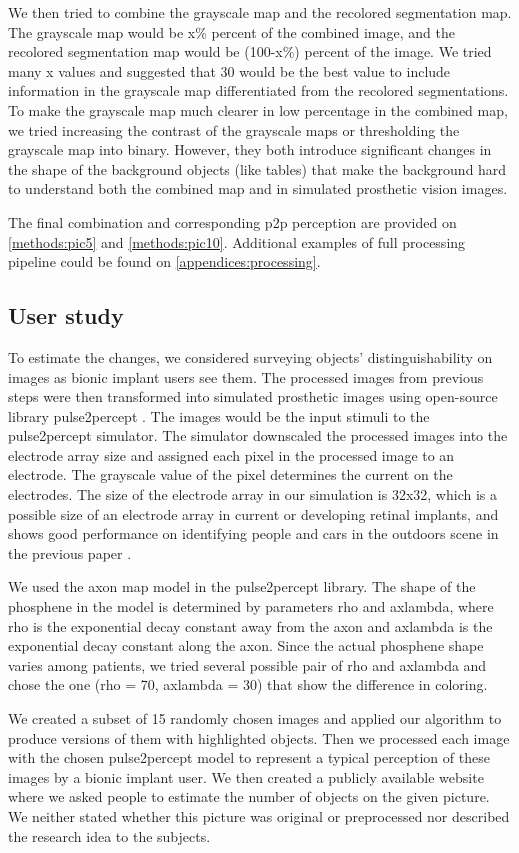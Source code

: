 We then tried to combine the grayscale map and the recolored segmentation map. The grayscale map would be x\% percent of the combined image, and the recolored segmentation map would be (100-x\%) percent of the image. We tried many x values and suggested that 30 would be the best value to include information in the grayscale map differentiated from the recolored segmentations.
To make the grayscale map much clearer in low percentage in the combined map, we tried increasing the contrast of the grayscale maps or thresholding the grayscale map into binary. However, they both introduce significant changes in the shape of the background objects (like tables) that make the background hard to understand both the combined map and in simulated prosthetic vision images.

The final combination and corresponding p2p perception are provided on \autoref{methods:pic5} and \autoref{methods:pic10}. Additional examples of full processing pipeline could be found on \autoref{appendices:processing}.

\subsection{User study}
\label{methods:survey}

To estimate the changes, we considered surveying objects' distinguishability on images as bionic implant users see them. 
The processed images from previous steps were then transformed into simulated prosthetic images using open-source library pulse2percept \cite{Beyeler148015}. The images would be the input stimuli to the pulse2percept simulator. The simulator downscaled the processed images into the electrode array size and assigned each pixel in the processed image to an electrode. The grayscale value of the pixel determines the current on the electrodes. The size of the electrode array in our simulation is 32x32, which is a possible size of an electrode array in current or developing retinal implants, and shows good performance on identifying people and cars in the outdoors scene in the previous paper \cite{han2021deep}.

We used the axon map model in the pulse2percept library. The shape of the phosphene in the model is determined by parameters rho and axlambda, where rho is the exponential decay constant away from the axon and axlambda is the exponential decay constant along the axon. Since the actual phosphene shape varies among patients, we tried several possible pair of rho and axlambda and chose the one (rho = 70, axlambda = 30) that show the difference in coloring.

We created a subset of 15 randomly chosen images and applied our algorithm to produce versions of them with highlighted objects. Then we processed each image with the chosen pulse2percept model to represent a typical perception of these images by a bionic implant user. We then created a publicly available website where we asked people to estimate the number of objects on the given picture. We neither stated whether this picture was original or preprocessed nor described the research idea to the subjects. 